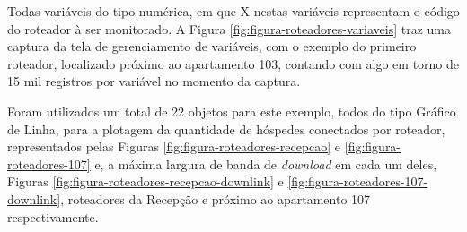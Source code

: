 Todas variáveis do tipo numérica, em que X nestas variáveis representam o código do roteador à ser monitorado. A Figura \ref{fig:figura-roteadores-variaveis} traz uma captura da tela de gerenciamento de variáveis, com o exemplo do primeiro roteador, localizado próximo ao apartamento 103, contando com algo em torno de 15 mil registros por variável no momento da captura.

        \begin{figure}[!h]
    	\end{figure}
    	
        \begin{figure}[!h]
    	\end{figure}
    	
Foram utilizados um total de 22 objetos para este exemplo, todos do tipo Gráfico de Linha, para a plotagem da quantidade de hóspedes conectados por roteador, representados pelas Figuras \ref{fig:figura-roteadores-recepcao} e \ref{fig:figura-roteadores-107} e, a máxima largura de banda de \textit{download} em cada um deles, Figuras \ref{fig:figura-roteadores-recepcao-downlink} e \ref{fig:figura-roteadores-107-downlink}, roteadores da Recepção e próximo ao apartamento 107 respectivamente.

